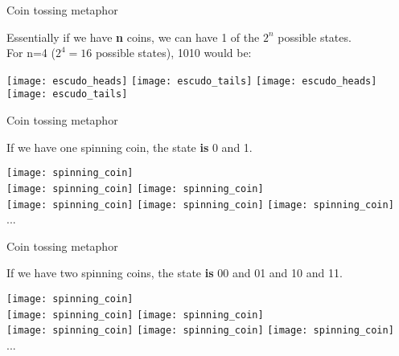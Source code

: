\documentclass[aspectratio=43]{beamer}
\begin{document}
\begin{frame}{Coin tossing metaphor}
	\begin{card}
		Essentially if we have \textbf{n} coins, we can have 1 of the \textbf{$2^n$} possible states.\\
		For n=4 ($2^4=16$ possible states), 1010 would be:
	\end{card}
    \begin{center}
        \texttt{[image: escudo\_heads]}
        \texttt{[image: escudo\_tails]}
        \texttt{[image: escudo\_heads]}
        \texttt{[image: escudo\_tails]}
	\end{center}
\pagenumber
\end{frame}

\begin{frame}{Coin tossing metaphor}
	\begin{cardTiny}
		If we have one spinning coin, the state \textbf{is} 0 and 1.
	\end{cardTiny}
    \begin{center}
        \texttt{[image: spinning\_coin]}\\
        \texttt{[image: spinning\_coin]}
        \texttt{[image: spinning\_coin]}\\
        \texttt{[image: spinning\_coin]}
        \texttt{[image: spinning\_coin]}
        \texttt{[image: spinning\_coin]}\\...
	\end{center}
\pagenumber
\end{frame}

\begin{frame}{Coin tossing metaphor}
	\begin{cardTiny}
		If we have two spinning coins, the state \textbf{is} 00 and 01 and 10 and 11.
	\end{cardTiny}
    \begin{center}
        \texttt{[image: spinning\_coin]}\\
        \texttt{[image: spinning\_coin]}
        \texttt{[image: spinning\_coin]}\\
        \texttt{[image: spinning\_coin]}
        \texttt{[image: spinning\_coin]}
        \texttt{[image: spinning\_coin]}\\...
	\end{center}
\pagenumber
\end{frame}
\end{document}
